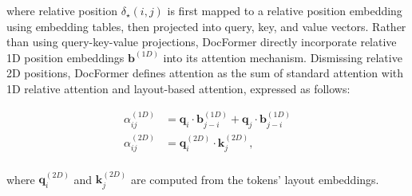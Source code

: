     
\noindent where relative position $\delta_{\star}(i, j)$ is first mapped to a relative position embedding using embedding tables, then projected into query, key, and value vectors. Rather than using query-key-value projections, DocFormer directly incorporate relative 1D position embeddings $\bm{b}^{(1D)}$ into its attention mechanism. Dismissing relative 2D positions, DocFormer defines attention as the sum of standard attention with 1D relative attention and layout-based attention, expressed as follows:

\begin{equation}
    \begin{aligned}
        \alpha^{(1D)}_{ij} &= \bm{q}_i \cdot \bm{b}^{(1D)}_{j-i} + \bm{q}_j \cdot \bm{b}^{(1D)}_{j-i} \\
        \alpha^{(2D)}_{ij} &= \bm{q}^{(2D)}_i \cdot \bm{k}^{(2D)}_j, \\
\end{aligned}
\label{equation:docformer-attention}
\end{equation}

\noindent where $\bm{q}^{(2D)}_i$ and $\bm{k}^{(2D)}_j$ are computed from the tokens' layout embeddings. 


